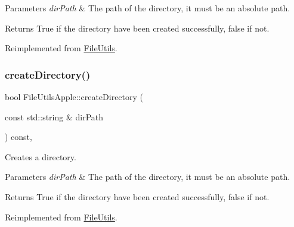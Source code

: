 \begin{DoxyParams}{Parameters}
{\em dir\+Path} & The path of the directory, it must be an absolute path. \\
\hline
\end{DoxyParams}
\begin{DoxyReturn}{Returns}
True if the directory have been created successfully, false if not. 
\end{DoxyReturn}


Reimplemented from \hyperlink{classFileUtils_a04129d55c22dfa031fd45aeda4de5e77}{File\+Utils}.

\mbox{\label{classFileUtilsApple_a104a38b7f8adf8de79f9ec2fcaa09735}} 
\subsubsection{\texorpdfstring{create\+Directory()}{createDirectory()}\hspace{0.1cm}{\footnotesize\ttfamily [2/2]}}
{\footnotesize\ttfamily bool File\+Utils\+Apple\+::create\+Directory (\begin{DoxyParamCaption}\item[{const std\+::string \&}]{dir\+Path }\end{DoxyParamCaption}) const\hspace{0.3cm}{\ttfamily [override]}, {\ttfamily [virtual]}}

Creates a directory.


\begin{DoxyParams}{Parameters}
{\em dir\+Path} & The path of the directory, it must be an absolute path. \\
\hline
\end{DoxyParams}
\begin{DoxyReturn}{Returns}
True if the directory have been created successfully, false if not. 
\end{DoxyReturn}


Reimplemented from \hyperlink{classFileUtils_a9d9383b68669dcbef30165514f26d7f6}{File\+Utils}.

\mbox{\label{classFileUtilsApple_aebc8f6fdf63b084f39ab0500b179368a}} 

